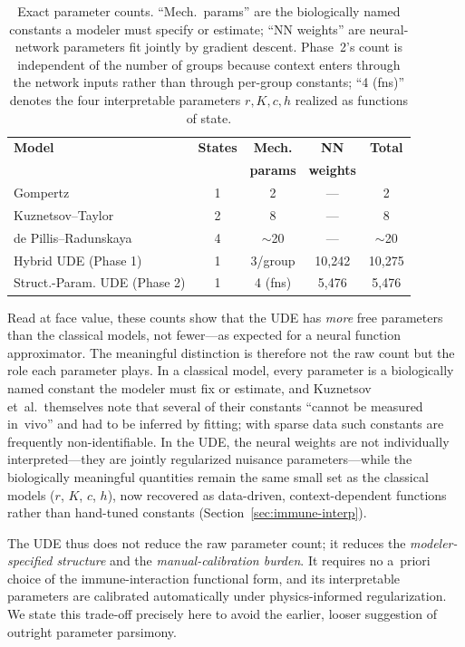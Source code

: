 \documentclass{juliacon}
\begin{document}
\begin{table}[H]\centering
\small
\begin{tabular}{@{}lcccc@{}}
\toprule
\textbf{Model} & \textbf{States} & \textbf{Mech.} & \textbf{NN} & \textbf{Total} \\
 & & \textbf{params} & \textbf{weights} & \\
\midrule
Gompertz & 1 & 2 & --- & 2 \\
Kuznetsov--Taylor & 2 & 8 & --- & 8 \\
de Pillis--Radunskaya & 4 & $\sim$20 & --- & $\sim$20 \\
\midrule
Hybrid UDE (Phase 1) & 1 & 3/group & 10{,}242 & 10{,}275 \\
Struct.-Param. UDE (Phase 2) & 1 & 4 (fns) & 5{,}476 & 5{,}476 \\
\bottomrule
\end{tabular}
\caption{Exact parameter counts. ``Mech.\ params'' are the biologically named constants a modeler must specify or estimate; ``NN weights'' are neural-network parameters fit jointly by gradient descent. Phase~2's count is independent of the number of groups because context enters through the network inputs rather than through per-group constants; ``4 (fns)'' denotes the four interpretable parameters $r,K,c,h$ realized as functions of state.}
\label{tab:param_counts}
\end{table}

Read at face value, these counts show that the UDE has \emph{more} free parameters than the classical models, not fewer---as expected for a neural function approximator. The meaningful distinction is therefore not the raw count but the role each parameter plays. In a classical model, every parameter is a biologically named constant the modeler must fix or estimate, and Kuznetsov et~al.\ themselves note that several of their constants ``cannot be measured in~vivo'' and had to be inferred by fitting; with sparse data such constants are frequently non-identifiable. In the UDE, the neural weights are not individually interpreted---they are jointly regularized nuisance parameters---while the biologically meaningful quantities remain the same small set as the classical models ($r$, $K$, $c$, $h$), now recovered as data-driven, context-dependent functions rather than hand-tuned constants (Section~\ref{sec:immune-interp}).

The UDE thus does not reduce the raw parameter count; it reduces the \emph{modeler-specified structure} and the \emph{manual-calibration burden}. It requires no a~priori choice of the immune-interaction functional form, and its interpretable parameters are calibrated automatically under physics-informed regularization. We state this trade-off precisely here to avoid the earlier, looser suggestion of outright parameter parsimony.
\end{document}
